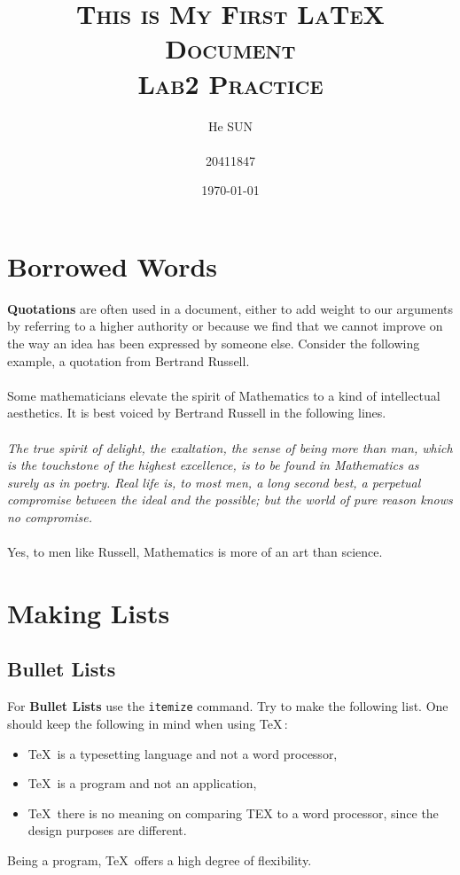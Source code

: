 \documentclass[a4paper, 11pt]{article}
\title{\textsc{This is My First LaTeX Document\\\small{Lab2 Practice}}}
\author{\Large{He SUN}\\\\20411847}   %
\date{\today}
\begin{document}
\maketitle

\section{Borrowed Words}
\textbf{Quotations} are often used in a document, either to add weight to our arguments by referring to a
higher authority or because we find that we cannot improve on the way an idea has been expressed
by someone else. Consider the following example, a quotation from Bertrand Russell.\\\\
Some mathematicians elevate the spirit of Mathematics to a kind of intellectual aesthetics. It is best
voiced by Bertrand Russell in the following lines.\\\\
\textit{The true spirit of delight, the exaltation, the sense of being more than man, which is the touchstone
of the highest excellence, is to be found in Mathematics as surely as in poetry. Real life is, to most
men, a long second best, a perpetual compromise between the ideal and the possible; but the world of
pure reason knows no compromise.}\\\\
Yes, to men like Russell, Mathematics is more of an art than science.

\section{Making Lists}
\subsection{Bullet Lists}
For \textbf{Bullet Lists} use the \texttt{itemize} command. Try to make the following list.
One should keep the following in mind when using \TeX\,:
\begin{itemize}
\item  \TeX\, is a typesetting language and not a word processor,
\item  \TeX\, is a program and not an application,
\item \TeX\, there is no meaning on comparing TEX to a word processor, since the design purposes are different.
\end{itemize}
Being a program, \TeX\, offers a high degree of flexibility.
\end{document}
